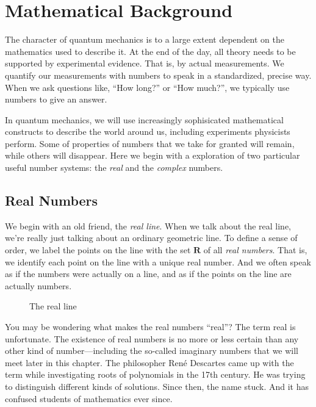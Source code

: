 \setchapterpreamble[u]{\margintoc}
\chapter{Mathematical Background}

The character of quantum mechanics is to a large extent dependent on the mathematics used to describe it. At the end of the day, all theory needs to be supported by experimental evidence. That is, by actual measurements. We quantify our measurements with numbers to speak in a standardized, precise way. When we ask questions like, ``How long?'' or ``How much?'', we typically use numbers to give an answer.

In quantum mechanics, we will use increasingly sophisicated mathematical constructs to describe the world around us, including experiments physicists perform. Some of properties of numbers that we take for granted will remain, while others will disappear. Here we begin with a exploration of two particular useful number systems: the \emph{real} and the \emph{complex} numbers.

\section{Real Numbers}

We begin with an old friend, the \emph{real line}. When we talk about the real line, we're really just talking about an ordinary geometric line. To define a sense of order, we label the points on the line with the set $\mathbf{R}$ of all \emph{real numbers}. That is, we identify each point on the line with a unique real number. And  we often speak as if the numbers were actually on a line, and as if the points on the line are actually numbers.

\begin{figure}[h]

\caption{The real line}
\end{figure}

You may be wondering what makes the real numbers ``real''? The term real is unfortunate. The existence of real numbers is no more or less certain than any other kind of number---including the so-called imaginary numbers that we will meet later in this chapter. The philosopher Ren\'e Descartes came up with the term while investigating roots of polynomials in the 17th century. He was trying to distinguish different kinds of solutions. Since then, the name stuck. And it has confused students of mathematics ever since.

